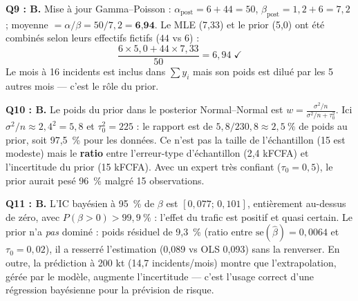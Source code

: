 \documentclass[11pt,a4paper]{article}
\begin{document}
\begin{corrigebox}
\textbf{Q9 : B.} Mise à jour Gamma--Poisson :
$\alpha_{\text{post}} = 6 + 44 = 50$,
$\beta_{\text{post}} = 1{,}2 + 6 = 7{,}2$ ;
moyenne $= \alpha/\beta = 50/7{,}2 = \textbf{6{,}94}$. Le MLE (7,33) et le
prior (5,0) ont été combinés selon leurs effectifs fictifs ($44$ vs $6$) :
\[
\frac{6 \times 5{,}0 + 44 \times 7{,}33}{50} = 6{,}94 \;\checkmark
\]
Le mois à 16 incidents est inclus dans $\sum y_i$ mais son poids est dilué par
les 5 autres mois --- c'est le rôle du prior.

\textbf{Q10 : B.} Le poids du prior dans le posterior Normal--Normal est
$w = \frac{\sigma^2/n}{\sigma^2/n + \tau_0^2}$. Ici
$\sigma^2/n \approx 2{,}4^2 = 5{,}8$ et $\tau_0^2 = 225$ : le rapport est de
$5{,}8/230{,}8 \approx 2{,}5~\%$ de poids au prior, soit 97,5~\% pour les
données. Ce n'est pas la taille de l'échantillon (15 est modeste) mais le
\textbf{ratio} entre l'erreur-type d'échantillon (2,4 kFCFA) et l'incertitude
du prior (15 kFCFA). Avec un expert très confiant ($\tau_0 = 0{,}5$), le prior
aurait pesé 96~\% malgré 15 observations.

\textbf{Q11 : B.} L'IC bayésien à 95~\% de $\beta$ est
$[0{,}077;\, 0{,}101]$, entièrement au-dessus de zéro, avec
$P(\beta > 0) > 99{,}9~\%$ : l'effet du trafic est positif et quasi certain.
Le prior n'a \emph{pas} dominé : poids résiduel de 9,3~\% (ratio entre
$\text{se}(\hat\beta) = 0{,}0064$ et $\tau_0 = 0{,}02$), il a resserré
l'estimation (0,089 vs OLS 0,093) sans la renverser. En outre, la prédiction
à 200 kt (14,7 incidents/mois) montre que l'extrapolation, gérée par le
modèle, augmente l'incertitude --- c'est l'usage correct d'une régression
bayésienne pour la prévision de risque.
\end{corrigebox}
\end{document}
